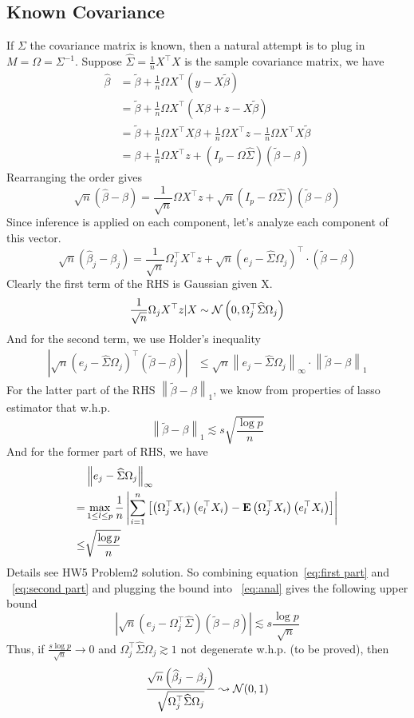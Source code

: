 \documentclass[12pt]{article}
\newcommand{\E}{{\bf E}}
\newcommand{\calN}{{\cal N}}
\newcommand{\bra}[1]{\left(#1\right)}
\newcommand{\abs}[1]{\left|#1\right|}
\newcommand{\norm}[1]{\left\|#1\right\|}
\newcommand{\wh}[1]{\widehat{#1}}
\newcommand{\wt}[1]{\widetilde{#1}}
\def\beq{\begin{equation}}
\def\eeq{\end{equation}}
\def\beqal{\begin{equation}\begin{aligned}}
\def\eeqal{\end{aligned}\end{equation}}
\begin{document}
\subsection{Known Covariance}
If $\Sigma$ the covariance matrix is known, then a natural attempt is to plug in $M = \Omega=\Sigma^{-1}$. Suppose $\wh{\Sigma}=\frac{1}{n}X^\top X$ is the sample covariance matrix, we have
\beqal\label{eq:anal1}
\wh{\beta}&=\wt{\beta}+ \frac{1}{n}\Omega X^\top \bra{y-X\wt{\beta}}\\
&=\wt{\beta}+ \frac{1}{n}\Omega X^\top \bra{X\beta +z -X\wt{\beta}}\\
&= \wt{\beta}+ \frac{1}{n}\Omega X^\top X\beta + \frac{1}{n}\Omega X^\top z - \frac{1}{n}\Omega X^\top X\wt{\beta}\\
&=\beta + \frac{1}{n}\Omega X^\top z+\bra{I_p-\Omega \wh{\Sigma}}\bra{\wt{\beta}-\beta}
\eeqal
Rearranging the order gives
\beq\label{eq:anal2}
\sqrt{n}\bra{\wh{\beta}-\beta}=\frac{1}{\sqrt{n}}\Omega X^\top z+\sqrt{n}\bra{I_p-\Omega \wh{\Sigma}}\bra{\wt{\beta}-\beta}
\eeq
Since inference is applied on each component, let's analyze each component of this vector.
\beq\label{eq:anal3}
\sqrt{n}\bra{\wh{\beta}_j-\beta_j}=\frac{1}{\sqrt{n}}\Omega_j^\top X^\top z+\sqrt{n}\bra{e_j-\wh{\Sigma}\Omega_j}^{\top} \cdot \bra{\wt{\beta}-\beta}
\eeq
Clearly the first term of the RHS is Gaussian given X. 
\beq\label{eq:anal4}
\frac{1}{\sqrt{n}}\Omega_j X^\top z|X \sim \calN\bra{0, \Omega_j^\top \wh{\Sigma}\Omega_j} 
\eeq
And for the second term, we use Holder's inequality
\beqal\label{eq:anal}
\abs{\sqrt{n}\bra{e_j-  \wh{\Sigma}\Omega_j}^\top \bra{\wt{\beta}-\beta}}&\leq \sqrt{n}\norm{e_j-  \wh{\Sigma}\Omega_j}_\infty\cdot \norm{\wt{\beta}-\beta}_1
\eeqal
For the latter part of the RHS $\norm{\wt{\beta}-\beta}_1$, we know from properties of lasso estimator that w.h.p.
\beq\label{eq:second part}
\norm{\wt{\beta}-\beta}_1\lesssim s\sqrt{\frac{\log p}{n}}
\eeq
And for the former part of RHS, we have
\beqal\label{eq:first part}
&\norm{e_j-  \wh{\Sigma}\Omega_j}_\infty\\
=& \max_{1\leq l\leq p}\frac{1}{n}\abs{\sum_{i=1}^{n} \left[ \bra{\Omega_j^\top X_i}\bra{ e_l^\top X_i }- \E \bra{\Omega_j^\top X_i}\bra{ e_l^\top X_i }  \right] }\\
\leq &\sqrt{\frac{\log p}{n}}
\eeqal
Details see HW5 Problem2 solution. So combining equation~\ref{eq:first part} and ~\ref{eq:second part} and plugging the bound into ~\ref{eq:anal} gives the following upper bound
\beq
\abs{\sqrt{n}\bra{e_j-\Omega_j^\top \wh{\Sigma}}\bra{\wt{\beta}-\beta}}\lesssim s\frac{\log p}{\sqrt{n}}
\eeq
Thus, if $\frac{s\log p}{\sqrt{n}}\rightarrow 0 $ and $\Omega_j^\top \wh{\Sigma}\Omega_j\gtrsim 1$ not degenerate w.h.p. (to be proved), then
\beq
\frac{\sqrt{n}\bra{\wh{\beta}_j-\beta_j}}{\sqrt{\Omega_j^\top \wh{\Sigma}\Omega_j}}\leadsto \calN(0,1)
\eeq
\end{document}
